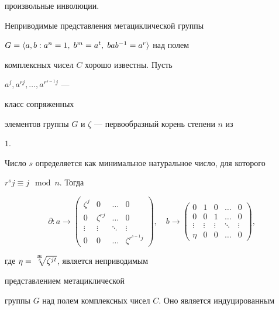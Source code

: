 произвольные инволюции.





Неприводимые представления метациклической группы


$G=\langle a,b:a^n=1,\;b^m=a^t,\;bab^{-1}=a^r\rangle$ над полем


комплексных чисел $C$ хорошо известны. Пусть


$a^j,a^{rj},\dotsc,a^{r^{s-1}j}$ ---


класс сопряженных


элементов группы $G$ и $\zeta$ --- первообразный корень степени $n$ из


$1$.


Число $s$ определяется как минимальное натуральное число, для которого


$r^s j\equiv j\mod{n}$. Тогда


$$


\partial: a\longrightarrow


\begin{pmatrix}


\zeta^j & 0 & \dots & 0 \\


0 & \zeta^{rj} & \dots & 0 \\


\vdots & \vdots & \ddots & \vdots \\


0 & 0 & \dots & \zeta^{r^{s-1}j}


\end{pmatrix}


,\quad b\longrightarrow


\begin{pmatrix}


0 & 1 & 0 & \dots & 0 \\


0 & 0 & 1 & \dots & 0 \\


\vdots & \vdots & \vdots & \ddots & \vdots \\


\eta & 0 & 0 & \dots & 0


\end{pmatrix}


,


$$


где $\eta=\sqrt[\uproot{4}{\frac{m}{s}}]{\zeta^{jt}}$, является неприводимым


представлением метациклической


группы $G$ над полем комплексных чисел $C$. Оно является индуцированным



